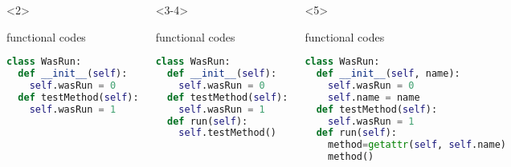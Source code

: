 \documentclass[lualatex]{beamer}
\begin{document}
\begin{frame}[fragile,t]
\begin{columns}[t]
        \begin{onlyenv}<2>
            \begin{block}{functional codes}
                \begin{lstlisting}[language=Python,columns=fullflexible]
class WasRun:
  def __init__(self):
    self.wasRun = 0
  def testMethod(self):
    self.wasRun = 1
                \end{lstlisting}
            \end{block}
        \end{onlyenv}
        \begin{onlyenv}<3-4>
            \begin{block}{functional codes}
                \begin{lstlisting}[language=Python,columns=fullflexible]
class WasRun:
  def __init__(self):
    self.wasRun = 0
  def testMethod(self):
    self.wasRun = 1
  def run(self):
    self.testMethod()
                \end{lstlisting}
            \end{block}
        \end{onlyenv}
        
        \begin{onlyenv}<5>
            \begin{block}{functional codes}
                \begin{lstlisting}[language=Python,columns=fullflexible]
class WasRun:
  def __init__(self, name):
    self.wasRun = 0
    self.name = name
  def testMethod(self):
    self.wasRun = 1
  def run(self):
    method=getattr(self, self.name)
    method()
                \end{lstlisting}
            \end{block}
        \end{onlyenv}
    \end{columns}        
\end{frame}
\end{document}
